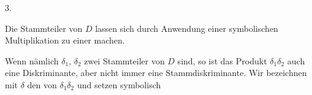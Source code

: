 3. 

Die Stammteiler von $D$ lassen sich durch Anwendung einer
symbolischen Multiplikation zu einer  machen.

Wenn nämlich $\delta_1$, $\delta_2$ zwei Stammteiler von $D$ sind, so ist
das Produkt $\delta_1\delta_2$ auch eine Diskriminante, aber nicht immer
eine Stammdiskriminante. Wir bezeichnen mit $\delta$ den 
von $\delta_1\delta_2$ und setzen symbolisch

